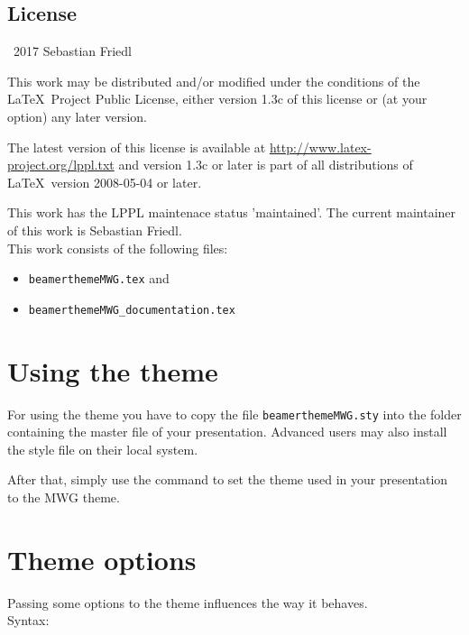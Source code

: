 \documentclass[11pt]{ltxdoc}
\begin{document}
	\subsection*{License}
	\begin{small}
		\textcopyright\ 2017 Sebastian Friedl
		
		\smallskip
		This work may be distributed and/or modified under the conditions of the \LaTeX\ Project Public License, either version 1.3c of this license or (at your option) any later version.
		
		\smallskip
		The latest version of this license is available at \url{http://www.latex-project.org/lppl.txt} and version 1.3c or later is part of all distributions of \LaTeX\ version 2008-05-04 or later.
	
		\smallskip
		This work has the LPPL maintenace status 'maintained'. The current maintainer of this work is Sebastian Friedl. \\
		This work consists of the following files:
		\begin{itemize} \itemsep 0pt
			\item \texttt{beamerthemeMWG.tex} and
			\item \texttt{beamerthemeMWG\_documentation.tex}
		\end{itemize}
	\end{small}
	
	\clearpage
	
	
	
	
	
	\section{Using the theme}
	For using the theme you have to copy the file \texttt{beamerthemeMWG.sty} into the folder containing the master file of your presentation. Advanced users may also install the style file on their local system. \par
	After that, simply use the command \texttt{} to set the theme used in your presentation to the MWG theme.

	
	\section{Theme options}				\label{themeoptions}
	Passing some options to the theme influences the way it behaves. \\
	Syntax: \ \ \texttt{}
	
\end{document}
